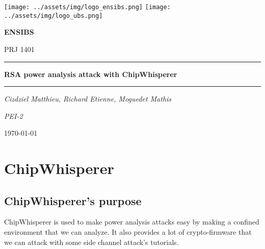 \documentclass[a4paper,12pt]{article}
\begin{document}
\begin{titlepage}
  \vspace*{-2cm}
  \hspace*{-2cm}\texttt{[image: ../assets/img/logo\_ensibs.png]}
  \vspace*{-2cm}
  \hspace*{7cm}\texttt{[image: ../assets/img/logo\_ubs.png]}\par
  \vspace{4cm}
  \centering
  {\scshape\LARGE \textbf{ENSIBS} \par}

  \vspace{1cm}
  {\scshape\Large PRJ 1401 \par}
  \vspace{1cm}
  \rule{\linewidth}{0.4mm}\par %
  \vspace{1cm}
  {\huge\bfseries RSA power analysis attack with ChipWhisperer \par}
  \vspace{1cm}
  \rule{\linewidth}{0.4mm}\par %
  \par
  \vspace{1cm}
  {\Large\itshape Cizdziel Matthieu, Richard Etienne, Moguedet Mathis\par}
  \vspace{1cm}
  {\Large\itshape PEI-2\par}
  \vspace{3cm}
  \par
  \vfill
  {\large \today\par}
\end{titlepage}

\newpage

\tableofcontents
\newpage


\section{ChipWhisperer}
\subsection{ChipWhisperer's purpose}
ChipWhisperer is used to make power analysis attacks easy by making a confined environment that we can analyze. It also provides a lot of crypto-firmware that we can attack with some side channel attack's tutorials.
\end{document}
